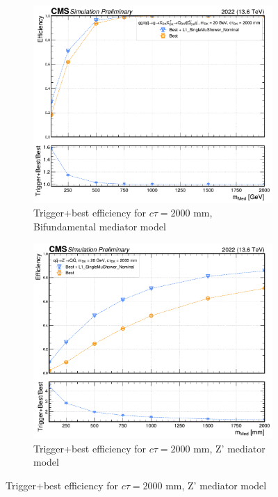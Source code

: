 \begin{figure}[h]
  \centering

  \begin{subfigure}[t]{0.45\textwidth}
    \centering
    \includegraphics[width=\linewidth]{images/L1/llp_1D_tchan/trigeffplots1D_L1_efftype-trigplusbest_t-channel_mDark-20_ctau-2000_L1_SingleMuShower_Nominal_study_cloppear.pdf}
    \caption{Trigger+best efficiency for $c\tau = 2000$ mm, Bifundamental mediator model}
    \label{fig:mus_eff1D_ctau2000_tchan}
  \end{subfigure}
  \hfill
  \begin{subfigure}[t]{0.45\textwidth}
    \centering
    \includegraphics[width=\linewidth]{images/L1/llp_1D_schan/trigeffplots1D_L1_efftype-trigplusbest_s-channel_mDark-20_ctau-2000_L1_SingleMuShower_Nominal_study_cloppear.pdf}
    \caption{Trigger+best efficiency for $c\tau = 2000$ mm, Z' mediator model}
    \label{fig:mus_eff1D_ctau2000_schan}
  \end{subfigure}


\end{figure}
